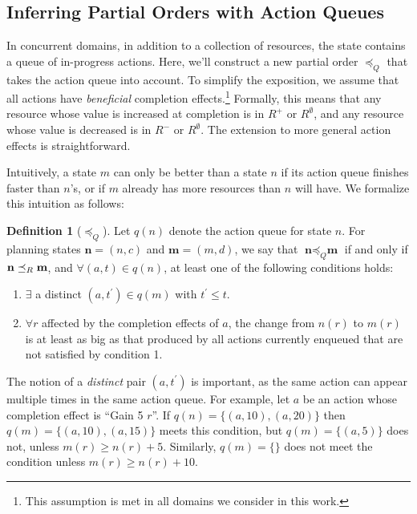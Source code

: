 \documentclass[letterpaper]{article}
\theoremstyle{plain} \newtheorem{theorem}{Theorem} \newtheorem{proposition}{Proposition} \newtheorem{lemma}{Lemma}
\theoremstyle{definition} \newtheorem{definition}{Definition} \newtheorem{conjecture}{Conjecture} \newtheorem*{example}{Example}
\theoremstyle{remark} \newtheorem*{remark}{Remark} \newtheorem*{note}{Note} \newtheorem{case}{Case}
\begin{document}
\subsection{Inferring Partial Orders with Action Queues}

\newcommand{\poq}{\preceq_Q}

In concurrent domains, in addition to a collection of resources, the state contains a queue
of in-progress actions. Here, we'll construct a new partial order $\poq$ that takes the
action queue into account. To simplify the exposition, we assume that all
actions have \emph{beneficial} completion effects.\footnote{This assumption is met in all
domains we consider in this work.} Formally, this means that any resource whose value is
increased at completion is in $R^+$ or $R^\emptyset$, and any resource whose value is decreased is in
$R^-$ or $R^\emptyset$. The extension to more general action effects is straightforward.

Intuitively, a state $m$ can only be better than a state $n$ if
its action queue finishes faster than $n$'s, or if $m$ already
has more resources than $n$ will have. We formalize this
intuition as follows:

\begin{definition}[$\poq$]
	\label{def-poq}
	Let $q(n)$ denote the action queue for state $n$. For planning states $\textbf{n} = (n, c)$ and $\textbf{m} = (m, d)$, we say that $\textbf{n} \poq \textbf{m}$ if and only if $\textbf{n} \preceq_R \textbf{m}$, and $\forall (a, t) \in q(n)$, at least one of the following conditions holds:
	\begin{enumerate}
		\item $\exists$ a distinct $ (a, t^\prime) \in q(m)$ with $t^\prime \le t$.
		\item $\forall r $ affected by the completion effects of $
      a$, the change from $n(r)$ to $m(r)$ is at least as big
      as that produced by all actions currently enqueued that
      are not satisfied by condition 1.
	\end{enumerate}
\end{definition}
The notion of a \emph{distinct} pair $(a, t^\prime)$ is important, as the same action can appear multiple times in the same action queue. For example, let $a$ be an action whose completion effect is ``Gain 5 $r$''. If $q(n) = \{(a, 10), (a, 20)\}$ then $q(m) = \{(a, 10),
(a, 15)\}$ meets this condition, but $q(m) = \{(a, 5)\}$ does not, unless $m(r) \ge n(r) + 5$. Similarly, $q(m) = \{\}$ does not meet the condition unless $m(r) \ge n(r) + 10$.
\end{document}
